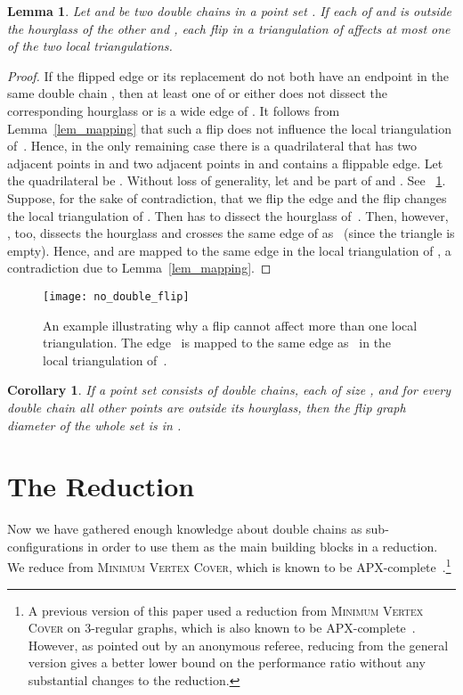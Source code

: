\documentclass[11pt,a4paper]{article}
\newcommand{\myqed}{\qed}
\renewcommand{\myqed}{}
\newtheorem{lemma}[theorem]{Lemma}
\newtheorem{corollary}[theorem]{Corollary}
\begin{document}
\begin{lemma}\label{lem_no_common_flip}
Let  and  be two double chains in a point set .
If each of  and  is outside the hourglass of the other and , each flip in a triangulation of  affects at most one of the two local triangulations.
\end{lemma}
\begin{proof}
If the flipped edge  or its replacement  do not both have an endpoint in the same double chain , then at least one of  or  either does not dissect the corresponding hourglass or is a wide edge of .
It follows from Lemma~\ref{lem_mapping} that such a flip does not influence the local triangulation of~.
Hence, in the only remaining case there is a quadrilateral that has two adjacent points in  and two adjacent points in  and contains a flippable edge.
Let the quadrilateral be .
Without loss of generality, let  and  be part of  and .
See \figurename~\ref{fig_no_double_flip}.
Suppose, for the sake of contradiction, that we flip the edge  and the flip changes the local triangulation of .
Then  has to dissect the hourglass of~.
Then, however, , too, dissects the hourglass and crosses the same edge of  as~ (since the triangle  is empty).
Hence,  and  are mapped to the same edge in the local triangulation of , a contradiction due to Lemma~\ref{lem_mapping}.
\myqed
\end{proof}

\begin{figure}
\centering
\texttt{[image: no\_double\_flip]}
\caption{An example illustrating why a flip cannot affect more than one local triangulation.
The edge~ is mapped to the same edge as~ in the local triangulation of~.}
\label{fig_no_double_flip}
\end{figure}


\begin{corollary}\label{cor_distance}
If a point set consists of  double chains, each of size , and for every double chain all other points are outside its hourglass, then the flip graph diameter of the whole set is in .
\end{corollary}

\section{The Reduction}
\label{sec_reduction}
Now we have gathered enough knowledge about double chains as sub-configurations in order to use them as the main building blocks in a reduction.
We reduce from \textsc{Minimum Vertex Cover}, which is known to be APX-complete~\cite{vertex_cover_apx}.\footnote{A previous version of this paper used a reduction from \textsc{Minimum Vertex Cover} on 3-regular graphs, which is also known to be APX-complete~\cite{cubic_apx}. However, as pointed out by an anonymous referee, reducing from the general version gives a better lower bound on the performance ratio without any substantial changes to the reduction.} 
\end{document}
